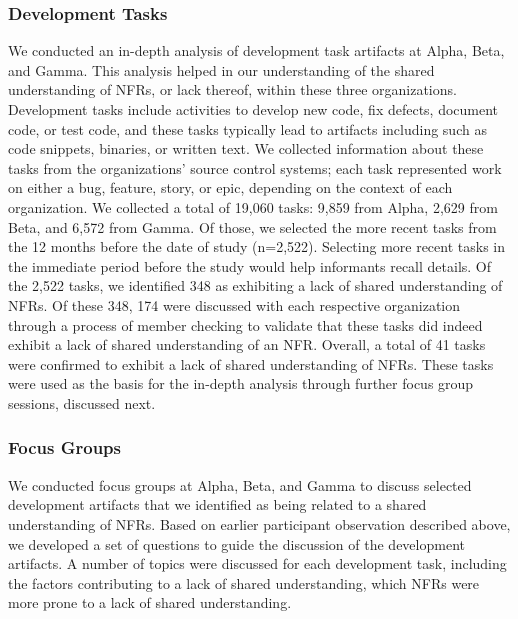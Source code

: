 \documentclass[smallextended]{svjour3}        %
\begin{document}
\subsubsection{Development Tasks}
\label{dev_tasks}
We conducted an in-depth analysis of development task artifacts at Alpha, Beta, and Gamma. This analysis helped in our understanding of the shared understanding of NFRs, or lack thereof, within these three organizations.
Development tasks include activities to develop new code, fix defects, document code, or test code, and these tasks typically lead to artifacts including such as code snippets, binaries, or written text. 
We collected information about these tasks from the organizations' source control systems; 
each task represented work on either a bug, feature, story, or epic, depending on the context of each organization.
We collected a total of 19,060 tasks: 9,859 from Alpha, 2,629 from Beta, and 6,572 from Gamma. Of those, we selected the more recent tasks from the 12 months before the date of study (n=2,522). Selecting more recent tasks in the immediate period before the study would help informants recall details. Of the 2,522 tasks, we identified 348 as exhibiting a lack of shared understanding of NFRs. 
Of these 348, 174 were discussed with each respective organization through a process of member checking to validate that these tasks did indeed exhibit a lack of shared understanding of an NFR. %
Overall, a total of 41 tasks were confirmed to exhibit a lack of shared understanding of NFRs.
These tasks were used as the basis for the in-depth analysis through further focus group sessions, discussed next. 

\subsubsection{Focus Groups}
We conducted focus groups at Alpha, Beta, and Gamma to discuss  
selected development artifacts that we identified as being related to a shared understanding of NFRs. 
Based on earlier participant observation described above, we developed a set of questions to guide the discussion of the development artifacts. 
A number of topics were discussed for each development task, including the factors contributing to a lack of shared understanding, which NFRs were more prone to a lack of shared understanding. 
\end{document}
